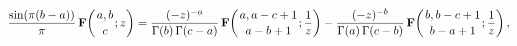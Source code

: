 \[\frac{\mathop{\sin\/}\nolimits\!\left(\pi(b-a)\right)}{\pi}\mathop{\mathbf{F}%
\/}\nolimits\!\left({a,b\atop c};z\right)=\frac{(-z)^{-a}}{\mathop{\Gamma\/}%
\nolimits\!\left(b\right)\mathop{\Gamma\/}\nolimits\!\left(c-a\right)}\mathop{%
\mathbf{F}\/}\nolimits\!\left({a,a-c+1\atop a-b+1};\frac{1}{z}\right)-\frac{(-%
z)^{-b}}{\mathop{\Gamma\/}\nolimits\!\left(a\right)\mathop{\Gamma\/}\nolimits%
\!\left(c-b\right)}\mathop{\mathbf{F}\/}\nolimits\!\left({b,b-c+1\atop b-a+1};%
\frac{1}{z}\right),\]